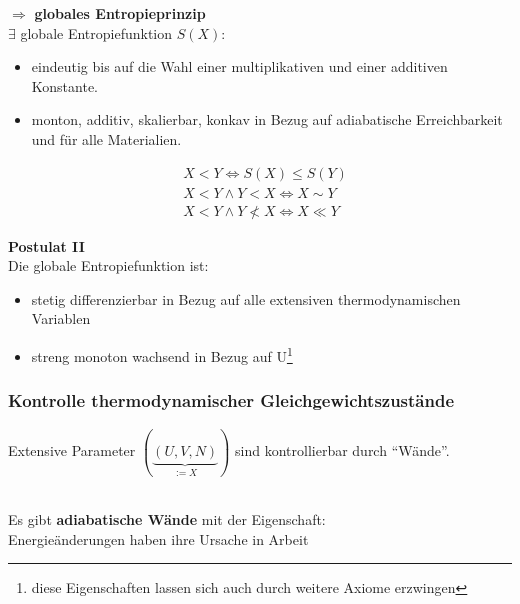 \documentclass[10pt,article,colorback,accentcolor=tud9d]{scrartcl}
\begin{document}
$\Rightarrow$ \textbf{globales Entropieprinzip}\\
$\exists$ globale Entropiefunktion $S(X)$:
\begin{itemize}
\item eindeutig bis auf die Wahl einer multiplikativen und einer additiven Konstante.
\item monton, additiv, skalierbar, konkav in Bezug auf adiabatische Erreichbarkeit und für alle Materialien.
\end{itemize}
\begin{fleqn}
\begin{equation}
\begin{aligned}
&X<Y \Leftrightarrow S(X) \leq S(Y)\\
&X<Y \wedge Y<X \Leftrightarrow X \sim Y\\
&X<Y \wedge Y\not<X \Leftrightarrow X \ll Y
\end{aligned}
\end{equation}
\end{fleqn}
\textbf{Postulat II}\\
Die globale Entropiefunktion ist:
\begin{itemize}
\item stetig differenzierbar in Bezug auf alle extensiven thermodynamischen Variablen
\item streng monoton wachsend in Bezug auf U\footnote{diese Eigenschaften lassen sich auch durch weitere Axiome erzwingen}
\end{itemize}
\subsubsection{Kontrolle thermodynamischer Gleichgewichtszustände}
 \begin{doublespacing}Extensive Parameter $(\underbrace{(U,V,N)}_{:=X})$ sind kontrollierbar durch ``Wände''.\end{doublespacing}\\
 Es gibt \textbf{adiabatische Wände} mit der Eigenschaft:\\
 Energieänderungen haben ihre Ursache in Arbeit
\end{document}
